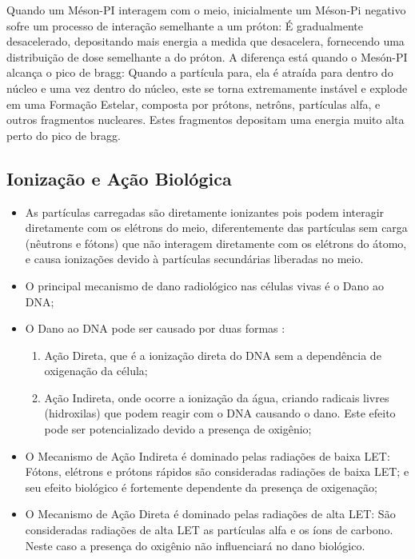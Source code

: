 \documentclass[11pt,a4paper]{article}
\begin{document}
    Quando um Méson-PI interagem com o meio, inicialmente um Méson-Pi negativo sofre um processo de interação semelhante a um próton: É gradualmente desacelerado, depositando mais energia a medida que desacelera, fornecendo uma distribuição de dose semelhante a do próton. A diferença está quando o Mesón-PI alcança o pico de bragg: Quando a partícula para, ela é atraída para dentro do núcleo e uma vez dentro do núcleo, este se torna extremamente instável e explode em uma Formação Estelar, composta por prótons, netrôns, partículas alfa, e outros fragmentos nucleares. Estes fragmentos depositam uma energia muito alta perto do pico de bragg.
            
\subsection*{Ionização e Ação Biológica}

	\begin{itemize}
		\item As partículas carregadas são diretamente ionizantes pois podem interagir diretamente com os elétrons do meio, diferentemente das partículas sem carga (nêutrons e fótons) que não interagem diretamente com os elétrons do átomo, e causa ionizações devido à partículas secundárias liberadas no meio. 
		
		\item O principal mecanismo de dano radiológico nas células vivas é o Dano ao DNA;
		
		\item O Dano ao DNA pode ser causado por duas formas :
		
			\begin{enumerate}
				\item Ação Direta, que é a ionização direta do DNA sem a dependência de oxigenação da célula;
				\item Ação Indireta, onde ocorre a ionização da água, criando radicais livres (hidroxilas) que podem reagir com o DNA causando o dano. Este efeito pode ser potencializado devido a presença de oxigênio;
			\end{enumerate}
		
		\item O Mecanismo de Ação Indireta é dominado pelas radiações de baixa LET: Fótons, elétrons e prótons rápidos são consideradas radiações de baixa LET; e seu efeito biológico é fortemente dependente da presença de oxigenação;
		
		\item O Mecanismo de Ação Direta é dominado pelas radiações de alta LET: São consideradas radiações de alta LET as partículas alfa e os íons de carbono. Neste caso a presença do oxigênio não influenciará no dano biológico. 
	\end{itemize}
            


        

\end{document}

